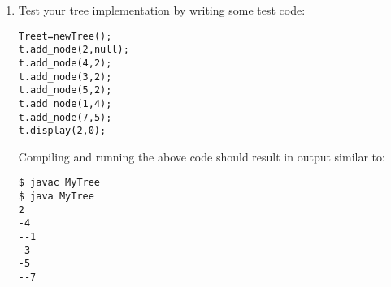 \documentclass[11pt,a4paper]{report}
\begin{document}
\begin{enumerate}
\newpage

\item Test your tree implementation by writing some test code:
\begin{alltt}
Tree t = new Tree();
t.add\_node(2, null);
t.add\_node(4, 2);
t.add\_node(3, 2);
t.add\_node(5, 2);
t.add\_node(1, 4);
t.add\_node(7, 5);
t.display(2, 0);
\end{alltt} 
    Compiling and running the above code should result in output similar to:
\begin{verbatim}
$ javac MyTree
$ java MyTree
2
-4
--1
-3
-5
--7
\end{verbatim}
    
\end{enumerate}
\end{document}
